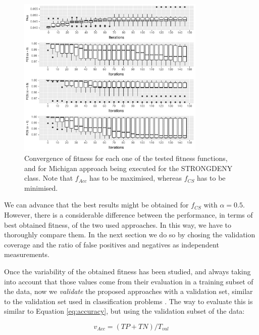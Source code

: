 \documentclass[runningheads]{llncs}
\begin{document}
\begin{figure}[h!tb]
	\centering
	\includegraphics[width=0.8\textwidth]{img/michiganItvsF_deny.pdf}
	\caption{Convergence of fitness for each one of the tested fitness functions, and for Michigan approach being executed for the STRONGDENY class. Note that $f_{Acc}$ has to be maximised, whereas $f_{CS}$ has to be minimised.}
	\label{fig:michiganItvsF_deny}
\end{figure}

We can advance that the best results might be obtained for $f_{CS}$
with $\alpha = 0.5$. However, there is a considerable difference between the performance, in terms of best
obtained fitness, of the two used approaches. In this way, we have to thoroughly compare them. In the next section we do so by chosing the validation coverage and the ratio of false positives and negatives as independent measurements. 

\label{subsec:approachcomparison}

Once the variability of the obtained fitness has been studied, and
always taking into account that those values come from their
evaluation in a training subset of the data, now we \textit{validate}
the proposed approaches with a validation set, similar to the validation set used in classification problems \cite{witten2005data}. 
 The way to evaluate this is similar to Equation \ref{eq:accuracy}, but using the validation subset of the data:

\begin{equation}
\label{eq:VALaccuracy}
v_{Acc} = (TP + TN) / T_{val}
\end{equation}
\end{document}
